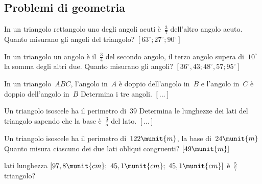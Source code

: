 \newpage

\subsection{Problemi di geometria}

\begin{htmulticols}{2}
\begin{esercizio}[*]
\label{ese:14.82}
In un triangolo rettangolo uno degli angoli acuti è~\(\frac{3}{7}\) dell'altro 
angolo acuto. Quanto misurano gli angoli del triangolo?
 \hfill \(\left[63^{\circ}; 27^{\circ}; 90^{\circ}\right]\)
\end{esercizio}

\begin{esercizio}[*]
\label{ese:14.83}
In un triangolo un angolo è il~\(\frac{3}{4}\) del secondo angolo, il terzo 
angolo 
supera di~\(10^{\circ}\) la somma degli altri due. Quanto misurano gli angoli?
 \hfill \(\left[36^{\circ},43; 48^{\circ},57; 95^{\circ}\right]\)
\end{esercizio}

\begin{esercizio}
\label{ese:14.84}
In un triangolo~\(ABC\), l'angolo in~\(A\) è doppio dell'angolo in~\(B\) e 
l'angolo 
in~\(C\) è doppio dell'angolo in~\(B\) Determina i tre angoli.
 \hfill \(\left[...\right]\)
\end{esercizio}

\begin{esercizio}
\label{ese:14.85}
Un triangolo isoscele ha il perimetro di~\(39\) Determina le lunghezze dei lati 
del triangolo sapendo che la base è~\(\frac{3}{5}\) del lato.
 \hfill \(\left[...\right]\)
\end{esercizio}

\begin{esercizio}[*]
\label{ese:14.86}
Un triangolo isoscele ha il perimetro di~\(122\munit{m}\), la base 
di~\(24\munit{m}\) 
Quanto misura ciascuno dei due lati obliqui congruenti?
 \hfill \(\left[49\munit{m}\right]\)
\end{esercizio}

lati 
lunghezza 
\(\left[97,8\munit{cm};~45,1\munit{cm};~45,1\munit{cm}\right]\)
% 
è~\(\frac{5}{7}\) 
triangolo?


\end{htmulticols}
